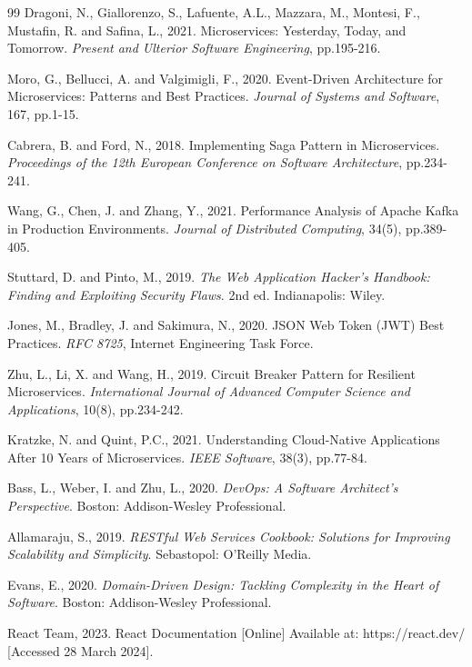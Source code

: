 \begin{thebibliography}{99}
Dragoni, N., Giallorenzo, S., Lafuente, A.L., Mazzara, M., Montesi, F., Mustafin, R. and Safina, L., 2021. Microservices: Yesterday, Today, and Tomorrow. \textit{Present and Ulterior Software Engineering}, pp.195-216.

Moro, G., Bellucci, A. and Valgimigli, F., 2020. Event-Driven Architecture for Microservices: Patterns and Best Practices. \textit{Journal of Systems and Software}, 167, pp.1-15.

Cabrera, B. and Ford, N., 2018. Implementing Saga Pattern in Microservices. \textit{Proceedings of the 12th European Conference on Software Architecture}, pp.234-241.

Wang, G., Chen, J. and Zhang, Y., 2021. Performance Analysis of Apache Kafka in Production Environments. \textit{Journal of Distributed Computing}, 34(5), pp.389-405.

Stuttard, D. and Pinto, M., 2019. \textit{The Web Application Hacker's Handbook: Finding and Exploiting Security Flaws}. 2nd ed. Indianapolis: Wiley.

Jones, M., Bradley, J. and Sakimura, N., 2020. JSON Web Token (JWT) Best Practices. \textit{RFC 8725}, Internet Engineering Task Force.

Zhu, L., Li, X. and Wang, H., 2019. Circuit Breaker Pattern for Resilient Microservices. \textit{International Journal of Advanced Computer Science and Applications}, 10(8), pp.234-242.

Kratzke, N. and Quint, P.C., 2021. Understanding Cloud-Native Applications After 10 Years of Microservices. \textit{IEEE Software}, 38(3), pp.77-84.

Bass, L., Weber, I. and Zhu, L., 2020. \textit{DevOps: A Software Architect's Perspective}. Boston: Addison-Wesley Professional.

Allamaraju, S., 2019. \textit{RESTful Web Services Cookbook: Solutions for Improving Scalability and Simplicity}. Sebastopol: O'Reilly Media.

Evans, E., 2020. \textit{Domain-Driven Design: Tackling Complexity in the Heart of Software}. Boston: Addison-Wesley Professional.

React Team, 2023. React Documentation [Online] Available at: https://react.dev/ [Accessed 28 March 2024].


\end{thebibliography}
